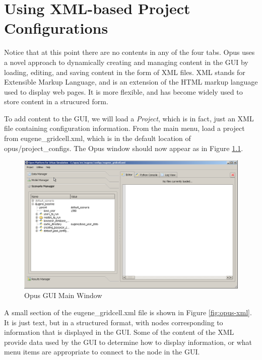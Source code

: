 \chapter{Using XML-based Project Configurations}
\label{chap:using-xml-based-project-configurations}

Notice that at this point there are no contents in any of the four tabs.  Opus uses a novel approach to dynamically creating and managing content in the GUI by loading, editing, and saving content in the form of XML files.  XML stands for Extensible Markup Language, and is an extension of the HTML markup language used to display web pages.  It is more flexible, and has become widely used to store content in a strucured form.  

To add content to the GUI, we will load a \emph{Project}, which is in fact, just an XML file containing configuration information.  From the main menu, load a project from eugene\_gridcell.xml, which is in the default location of opus/project\_configs.  The Opus window should now appear as in Figure \ref{fig:opus2}.

\begin{figure}[htp]
\begin{center}
\includegraphics[scale=0.4]{graphics/opus2.png}
\end{center}
\caption{Opus GUI Main Window}
\label{fig:opus2}
\end{figure}

A small section of the eugene\_gridcell.xml file is shown in Figure \ref{fig:opus-xml}.  It is just text, but in a structured format, with nodes corresponding to information that is displayed in the GUI.  Some of the content of the XML provide data used by the GUI to determine how to display information, or what menu items are appropriate to connect to the node in the GUI.

